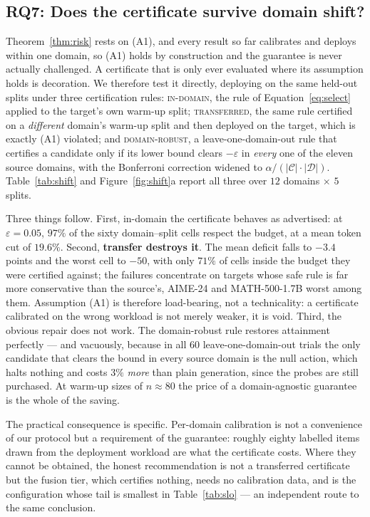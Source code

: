 \documentclass[acmsmall]{acmart}
\theoremstyle{acmdefinition}%
\theoremstyle{acmplain}}{}%
\begin{document}
\subsection{RQ7: Does the certificate survive domain shift?}\label{sec:rq7}
Theorem~\ref{thm:risk} rests on (A1), and every result so far calibrates and deploys within one domain, so (A1) holds by construction and the guarantee is never actually challenged. A certificate that is only ever evaluated where its assumption holds is decoration. We therefore test it directly, deploying on the same held-out splits under three certification rules: \textsc{in-domain}, the rule of Equation~\eqref{eq:select} applied to the target's own warm-up split; \textsc{transferred}, the same rule certified on a \emph{different} domain's warm-up split and then deployed on the target, which is exactly (A1) violated; and \textsc{domain-robust}, a leave-one-domain-out rule that certifies a candidate only if its lower bound clears $-\varepsilon$ in \emph{every} one of the eleven source domains, with the Bonferroni correction widened to $\alpha/(|\mathcal{C}|\cdot|\mathcal{D}|)$. Table~\ref{tab:shift} and Figure~\ref{fig:shift}a report all three over $12$ domains $\times$ $5$ splits.

Three things follow. First, in-domain the certificate behaves as advertised: at $\varepsilon=0.05$, $97\%$ of the sixty domain--split cells respect the budget, at a mean token cut of $19.6\%$. Second, \textbf{transfer destroys it}. The mean deficit falls to $-3.4$ points and the worst cell to $-50$, with only $71\%$ of cells inside the budget they were certified against; the failures concentrate on targets whose safe rule is far more conservative than the source's, AIME-24 and MATH-500-1.7B worst among them. Assumption (A1) is therefore load-bearing, not a technicality: a certificate calibrated on the wrong workload is not merely weaker, it is void. Third, the obvious repair does not work. The domain-robust rule restores attainment perfectly --- and vacuously, because in all $60$ leave-one-domain-out trials the only candidate that clears the bound in every source domain is the null action, which halts nothing and costs $3\%$ \emph{more} than plain generation, since the probes are still purchased. At warm-up sizes of $n \approx 80$ the price of a domain-agnostic guarantee is the whole of the saving.

The practical consequence is specific. Per-domain calibration is not a convenience of our protocol but a requirement of the guarantee: roughly eighty labelled items drawn from the deployment workload are what the certificate costs. Where they cannot be obtained, the honest recommendation is not a transferred certificate but the fusion tier, which certifies nothing, needs no calibration data, and is the configuration whose tail is smallest in Table~\ref{tab:slo} --- an independent route to the same conclusion.
\end{document}
